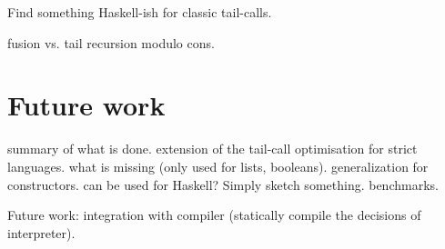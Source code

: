 \documentclass[diploma]{softlab-thesis}
\begin{document}
Find something Haskell-ish for classic tail-calls.

fusion vs. tail recursion modulo cons.


\chapter{Future work}
\label{ch:future}

summary of what is done.
extension of the tail-call optimisation for strict
languages.
what is missing (only used for lists, booleans).
generalization for constructors.
can be used for Haskell? Simply sketch something.
benchmarks.

Future work: integration with compiler (statically compile the decisions of interpreter).








\backmatter


\end{document}
